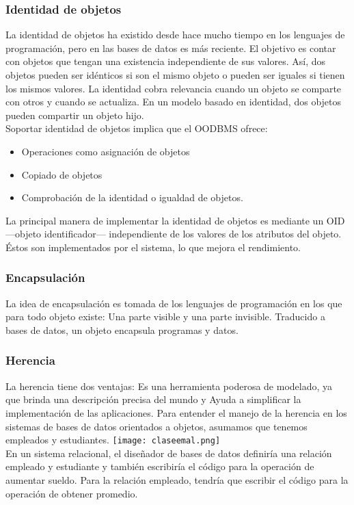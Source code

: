 \documentclass[12pts, A3 ,twosides]{article}
\begin{document}
\subsubsection{Identidad de objetos}
La identidad de objetos ha existido desde hace mucho tiempo en los lenguajes de programación, pero en las bases de datos es más reciente. El objetivo es contar con objetos que tengan una existencia independiente de sus valores. Así, dos objetos pueden ser idénticos si son el mismo objeto o pueden ser iguales si tienen los mismos valores. La identidad cobra relevancia cuando un objeto se comparte con otros y cuando se actualiza. En un modelo basado en identidad, dos objetos pueden compartir un objeto hijo.\\
Soportar identidad de objetos implica que el OODBMS ofrece:
\begin{itemize}
\item Operaciones como asignación de objetos
\item Copiado de objetos
\item Comprobación de la identidad o igualdad de objetos.
\end{itemize}

La principal manera de implementar la identidad de objetos es mediante un OID —objeto identificador— independiente de los valores de los atributos del objeto. Éstos son implementados por el sistema, lo que mejora el rendimiento.

\subsubsection{Encapsulación}
La idea de encapsulación es tomada de los lenguajes de programación en los que para todo objeto existe: Una parte visible y una parte invisible. Traducido a bases de datos, un objeto encapsula programas y datos.
\subsubsection{Herencia}
La herencia tiene dos ventajas: Es una herramienta poderosa de modelado, ya que brinda una descripción precisa del mundo y  Ayuda a simplificar la implementación de las aplicaciones. Para entender el manejo de la herencia en los sistemas de bases de datos orientados a objetos, asumamos que tenemos empleados y estudiantes.
\texttt{[image: claseemal.png]}\\
En un sistema relacional, el diseñador de bases de datos definiría una relación empleado y estudiante y también escribiría el código para la operación de aumentar sueldo. Para la relación empleado, tendría que escribir el código para la operación de obtener promedio.\\
\end{document}
